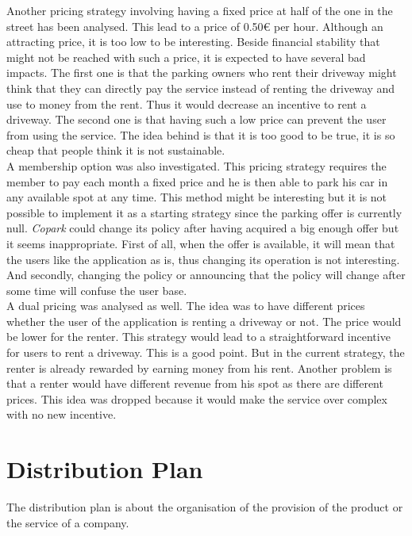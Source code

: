 \documentclass[12pt,a4paper,oneside]{book}
\newcommand{\bp}{\textit{Copark}}
\begin{document}
Another pricing strategy involving having a fixed price at half of the one in the street has been analysed. This lead to a price of 0.50\euro{} per hour. Although an attracting price, it is too low to be interesting. Beside financial stability that might not be reached with such a price, it is expected to have several bad impacts. The first one is that the parking owners who rent their driveway might think that they can directly pay the service instead of renting the driveway and use to money from the rent. Thus it would decrease an incentive to rent a driveway. The second one is that having such a low price can prevent the user from using the service. The idea behind is that it is too good to be true, it is so cheap that people think it is not sustainable.\\

A membership option was also investigated. This pricing strategy requires the member to pay each month a fixed price and he is then able to park his car in any available spot at any time. This method might be interesting but it is not possible to implement it as a starting strategy since the parking offer is currently null. \bp{} could change its policy after having acquired a big enough offer but it seems inappropriate. First of all, when the offer is available, it will mean that the users like the application as is, thus changing its operation is not interesting. And secondly, changing the policy or announcing that the policy will change after some time will confuse the user base.\\

A dual pricing was analysed as well. The idea was to have different prices whether the user of the application is renting a driveway or not. The price would be lower for the renter. This strategy would lead to a straightforward incentive for users to rent a driveway. This is a good point. But in the current strategy, the renter is already rewarded by earning money from his rent. Another problem is that a renter would have different revenue from his spot as there are different prices. This idea was dropped because it would make the service over complex with no new incentive.

\section{Distribution Plan}

The distribution plan is about the organisation of the provision of the product or the service of a company.\\
\end{document}
